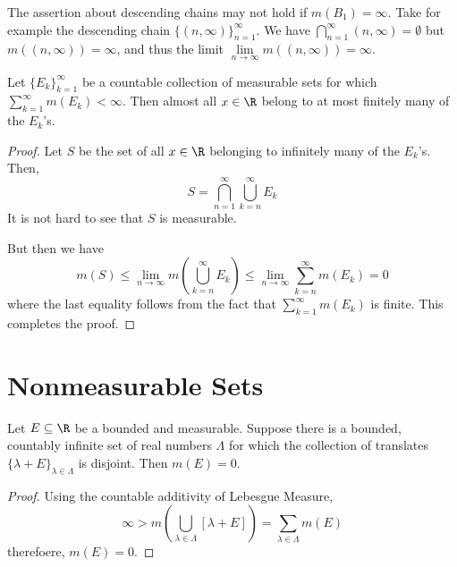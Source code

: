 The assertion about descending chains may not hold if $m(B_1) = \infty$. Take for example the descending chain $\{(n,\infty)\}_{n = 1}^\infty$. We have $\bigcap_{n = 1}^\infty (n,\infty) = \emptyset$ but $m((n,\infty)) = \infty$, and thus the limit $\lim\limits_{n\to\infty} m((n,\infty)) = \infty$. 

\begin{lemma}
    Let $\{E_k\}_{k = 1}^\infty$ be a countable collection of measurable sets for which $\sum_{k = 1}^\infty m(E_k) < \infty$. Then almost all $x\in\R$ belong to at most finitely many of the $E_k$'s.
\end{lemma}
\begin{proof}
    Let $S$ be the set of all $x\in\R$ belonging to infinitely many of the $E_k$'s. Then, 
    \begin{equation*}
        S = \bigcap_{n = 1}^\infty\bigcup_{k = n}^\infty E_k
    \end{equation*}
    It is not hard to see that $S$ is measurable.

    But then we have 
    \begin{equation*}
        m\left(S\right)\le\lim_{n\to\infty} m\left(\bigcup_{k = n}^\infty E_k\right)\le\lim_{n\to\infty}\sum_{k = n}^\infty m(E_k) = 0
    \end{equation*}
    where the last equality follows from the fact that $\sum_{k = 1}^\infty m(E_k)$ is finite. This completes the proof.
\end{proof}

\section{Nonmeasurable Sets}

\begin{lemma}
    Let $E\subseteq\R$ be a bounded and measurable. Suppose there is a bounded, countably infinite set of real numbers $\Lambda$ for which the collection of translates $\{\lambda + E\}_{\lambda\in\Lambda}$ is disjoint. Then $m(E) = 0$.
\end{lemma}
\begin{proof}
    Using the countable additivity of Lebesgue Measure, 
    \begin{equation*}
        \infty > m\left(\bigcup_{\lambda\in\Lambda}[\lambda + E]\right) = \sum_{\lambda\in\Lambda} m(E)
    \end{equation*}
    therefoere, $m(E) = 0$.
\end{proof}

